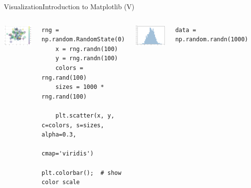 \documentclass[10pt,compress]{beamer} %
\begin{document}
\begin{frame}[fragile]{Visualization}{Introduction to Matplotlib (V)}
	\begin{columns}
	\includegraphics[width=\textwidth]{figs/matplotlib-scatterplot2.png}\\

	\begin{exampleblock}{}
	\vspace{-0.2cm} 
	\begin{lstlisting}[basicstyle=\tiny]
	rng = np.random.RandomState(0)
	x = rng.randn(100)
	y = rng.randn(100)
	colors = rng.rand(100)
	sizes = 1000 * rng.rand(100)

	plt.scatter(x, y, c=colors, s=sizes, alpha=0.3,
	            cmap='viridis')
				plt.colorbar();  # show color scale
	\end{lstlisting}
	\vspace{-0.2cm} 
	\end{exampleblock}

	\centering \includegraphics[width=\textwidth]{figs/matplotlib-histogram.png}\\
	\begin{exampleblock}{}
	\vspace{-0.2cm} 
	\begin{lstlisting}[basicstyle=\tiny]
	data = np.random.randn(1000)


\end{lstlisting}
\end{exampleblock}
\end{columns}
\end{frame}
\end{document}

